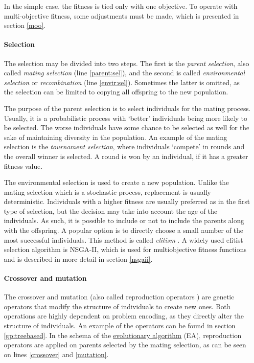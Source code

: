 In the simple case, the fitness is tied only with one objective. To operate
with multi-objective fitness, some adjustments must be made, which is presented
in section \ref{moo}.


\paragraph{Selection} \label{p}
The selection may be divided into two steps. The first is the 
\emph{parent selection}, also called \emph{mating selection}
(line \ref{parent:sel}), and the second is called
\emph{environmental selection} or \emph{recombination} (line \ref{envir:sel}).
Sometimes the latter is omitted, as the selection can be limited to copying 
all offspring to the new population.

The purpose of the parent selection is to select individuals for the
mating process. Usually, it is a probabilistic process with `better'
individuals being more likely to be selected. The worse individuals have some
chance to be selected as well for the sake of maintaining diversity in the
population. An example of the mating selection is the
\emph{tournament selection}, where individuals `compete' in rounds and the
overall winner is selected. A round is won by an individual, if it has a 
greater fitness value.

The environmental selection is used to create a new 
population. Unlike the mating selection which is a stochastic process,
replacement is usually deterministic. Individuals with a higher fitness are
usually preferred as in the first type of selection, but the decision may take 
into account the age of the individuals. As such, it is possible to include 
or not to include the parents along with the offspring. A popular option is to 
directly choose a small number of the most successful individuals. This method 
is called \emph{elitism} \citep{Eiben:2015:IEC:2810085}.
A widely used elitist selection algorithm is NSGA-II, which is used for
multiobjective fitness functions and is described in more detail in section
\ref{nsgaii}.

\paragraph{Crossover and mutation}
The crossover and mutation (also called reproduction operators
\citep{Engelbrecht:2007:CII:1557464}) are genetic operators that modify the
structure of individuals to create new ones. Both operations are highly
dependent on problem encoding, as they directly alter the structure of
individuals. An example of the operators can be found in section
\ref{gp:treebased}. In the schema of the
\hyperref[alg:EA]{evolutionary algorithm} (EA), reproduction operators
are applied on parents selected by the mating selection, as can be seen on 
lines \ref{crossover} and \ref{mutation}.

